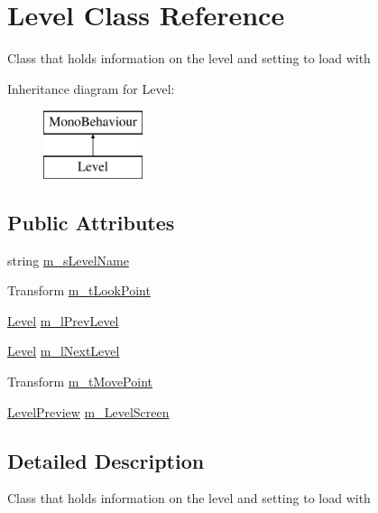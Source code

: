 \hypertarget{class_level}{}\section{Level Class Reference}
\label{class_level}


Class that holds information on the level and setting to load with  


Inheritance diagram for Level\+:\begin{figure}[H]
\begin{center}
\leavevmode
\includegraphics[height=2.000000cm]{class_level}
\end{center}
\end{figure}
\subsection*{Public Attributes}
\begin{DoxyCompactItemize}
\item 
string \mbox{\hyperlink{class_level_a43dd3dcb6745308d63be29012196c95b}{m\+\_\+s\+Level\+Name}}
\item 
Transform \mbox{\hyperlink{class_level_a4da3437f8e9c5f5b706284daad063252}{m\+\_\+t\+Look\+Point}}
\item 
\mbox{\hyperlink{class_level}{Level}} \mbox{\hyperlink{class_level_a5d13a734626467aa83674ffe7293c103}{m\+\_\+l\+Prev\+Level}}
\item 
\mbox{\hyperlink{class_level}{Level}} \mbox{\hyperlink{class_level_af2050b246b238c342aaf60734ac0e533}{m\+\_\+l\+Next\+Level}}
\item 
Transform \mbox{\hyperlink{class_level_a7284d976035d566382e1a120e3fd79cc}{m\+\_\+t\+Move\+Point}}
\item 
\mbox{\hyperlink{class_level_preview}{Level\+Preview}} \mbox{\hyperlink{class_level_a3c05dd260ac90122cd094bee059260e3}{m\+\_\+\+Level\+Screen}}
\end{DoxyCompactItemize}


\subsection{Detailed Description}
Class that holds information on the level and setting to load with 



